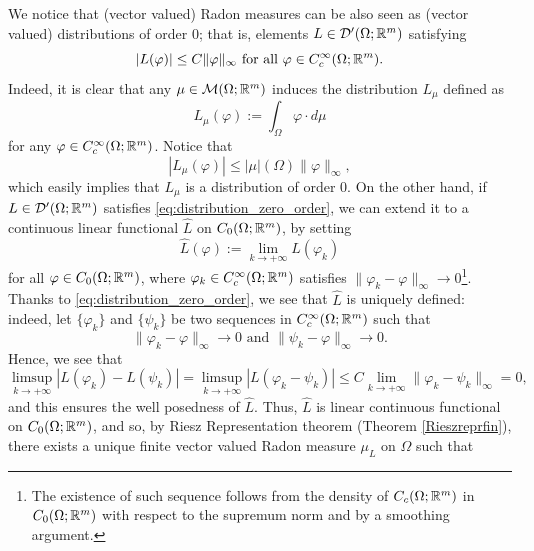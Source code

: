 \begin{remark}
We notice that (vector valued) Radon measures can be also seen as (vector valued) distributions of order $0$; that is, elements $L \in \mathcal{D}'(\Omega; \mathbb{R}^{m})$ satisfying
\begin{equation} \label{eq:distribution_zero_order}
|L(\varphi)| \le C \|\varphi\|_{\infty} \text{ for all } \varphi \in C^{\infty}_{c}(\Omega; \mathbb{R}^{m}).
\end{equation} 
Indeed, it is clear that any $\mu \in \mathcal{M}(\Omega; \mathbb{R}^{m})$ induces the distribution $L_{\mu}$ defined as
\begin{equation*}
L_{\mu}(\varphi) := \int_{\Omega} \varphi \cdot d \mu
\end{equation*}
for any $\varphi \in C^{\infty}_{c}(\Omega; \mathbb{R}^{m})$. Notice that $$|L_{\mu}(\varphi)| \le |\mu|(\Omega) \|\varphi\|_{\infty},$$
which easily implies that $L_{\mu}$ is a distribution of order $0$. On the other hand, if $L \in \mathcal{D}'(\Omega; \mathbb{R}^{m})$ satisfies \eqref{eq:distribution_zero_order}, we can extend it to a continuous linear functional $\widehat{L}$ on $C_{0}(\Omega; \mathbb{R}^{m})$, by setting
\begin{equation*}
\widehat{L}(\varphi) := \lim_{k \to + \infty} L(\varphi_{k})
\end{equation*}
for all $\varphi \in C_{0}(\Omega; \mathbb{R}^{m})$, where $\varphi_{k} \in C^{\infty}_{c}(\Omega; \mathbb{R}^{m})$ satisfies $\|\varphi_{k} - \varphi\|_{\infty} \to 0$\footnote{The existence of such sequence follows from the density of $C_{c}(\Omega; \mathbb{R}^{m})$ in $C_{0}(\Omega; \mathbb{R}^{m})$ with respect to the supremum norm and by a smoothing argument.}. Thanks to \eqref{eq:distribution_zero_order}, we see that $\widehat{L}$ is uniquely defined: indeed, let $\{\varphi_{k}\}$ and $\{\psi_{k}\}$ be two sequences in $C^{\infty}_{c}(\Omega; \mathbb{R}^{m})$ such that 
\begin{equation*}
\|\varphi_{k} - \varphi\|_{\infty} \to 0 \text{ and } \|\psi_{k} - \varphi\|_{\infty} \to 0.
\end{equation*}
Hence, we see that
\begin{equation*}
\limsup_{k \to + \infty} |L(\varphi_{k}) - L(\psi_{k})| = \limsup_{k \to + \infty} |L(\varphi_{k} - \psi_{k})| \le C \lim_{k \to + \infty} \|\varphi_{k} - \psi_{k}\|_{\infty} = 0,
\end{equation*}
and this ensures the well posedness of $\widehat{L}$. Thus, $\widehat{L}$ is linear continuous functional on $C_{0}(\Omega; \mathbb{R}^{m})$, and so, by Riesz Representation theorem (Theorem \ref{Rieszreprfin}), there exists a unique finite vector valued Radon measure $\mu_{L}$ on $\Omega$ such that

\end{remark}
